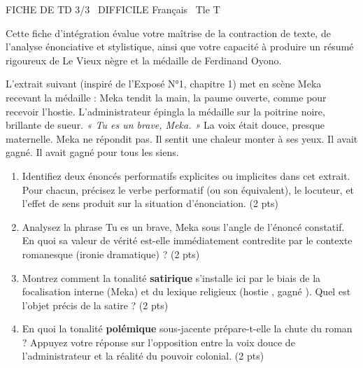\documentclass[11pt]{article}
\begin{document}
\begin{tcolorbox}[enhanced,colback=popink,colframe=popink,arc=10pt,boxrule=0pt,left=12pt,right=12pt,top=9pt,bottom=9pt]
{\color{white}\popxbold\small FICHE DE TD 3/3 \textbullet\ DIFFICILE \hfill Français \textbullet\ Tle T\par}
\end{tcolorbox}
\vspace{4pt}
Cette fiche d'intégration évalue votre maîtrise de la contraction de texte, de l'analyse énonciative et stylistique, ainsi que votre capacité à produire un résumé rigoureux de \og Le Vieux nègre et la médaille \fg{} de Ferdinand Oyono.

\begin{exercice}
L'extrait suivant (inspiré de l'Exposé N°1, chapitre 1) met en scène Meka recevant la médaille : 
\og Meka tendit la main, la paume ouverte, comme pour recevoir l'hostie. L'administrateur épingla la médaille sur la poitrine noire, brillante de sueur. \textit{« Tu es un brave, Meka. »} La voix était douce, presque maternelle. Meka ne répondit pas. Il sentit une chaleur monter à ses yeux. Il avait gagné. Il avait gagné pour tous les siens. \fg{}

\begin{enumerate}
    \item Identifiez deux énoncés performatifs explicites ou implicites dans cet extrait. Pour chacun, précisez le verbe performatif (ou son équivalent), le locuteur, et l'effet de sens produit sur la situation d'énonciation. (2 pts)
    \item Analysez la phrase \og Tu es un brave, Meka \fg{} sous l'angle de l'énoncé constatif. En quoi sa valeur de vérité est-elle immédiatement contredite par le contexte romanesque (ironie dramatique) ? (2 pts)
    \item Montrez comment la tonalité \textbf{satirique} s'installe ici par le biais de la focalisation interne (Meka) et du lexique religieux (\og hostie \fg{}, \og gagné \fg{}). Quel est l'objet précis de la satire ? (2 pts)
    \item En quoi la tonalité \textbf{polémique} sous-jacente prépare-t-elle la chute du roman ? Appuyez votre réponse sur l'opposition entre la \og voix douce \fg{} de l'administrateur et la réalité du pouvoir colonial. (2 pts)
\end{enumerate}
\end{exercice}
\end{document}
